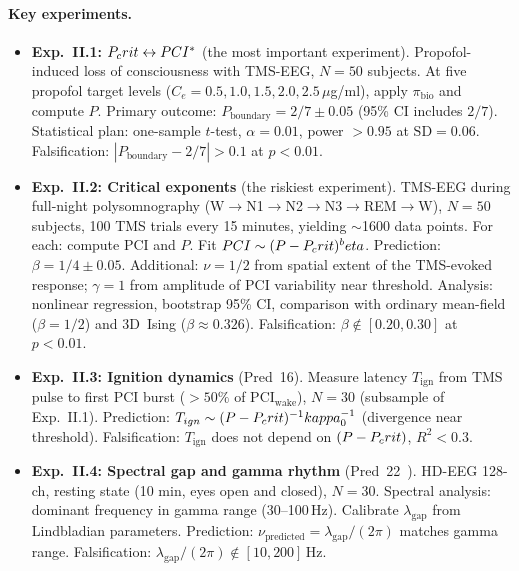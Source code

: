 \paragraph{Key experiments.}
\begin{itemize}[leftmargin=2em]
  \item \textbf{Exp.~II.1: $P_crit \leftrightarrow PCI^*$} (the most important
        experiment). Propofol-induced loss of consciousness with TMS-EEG, $N = 50$ subjects.
        At five propofol target levels ($C_e = 0.5, 1.0, 1.5, 2.0, 2.5$\,$\mu$g/ml), apply
        $\pi_{\mathrm{bio}}$ and compute $P$. Primary outcome:
        $P_{\mathrm{boundary}} = 2/7 \pm 0.05$ (95\% CI includes $2/7$). Statistical plan:
        one-sample $t$-test, $\alpha = 0.01$, power $> 0.95$ at $\mathrm{SD} = 0.06$.
        Falsification: $|P_{\mathrm{boundary}} - 2/7| > 0.1$ at $p < 0.01$.
  \item \textbf{Exp.~II.2: Critical exponents} (the riskiest experiment). TMS-EEG during
        full-night polysomnography (W$\to$N1$\to$N2$\to$N3$\to$REM$\to$W), $N = 50$
        subjects, 100 TMS trials every 15 minutes, yielding $\sim$1600 data points. For
        each: compute PCI and $P$. Fit $PCI \sim (P - P_crit)^beta$. Prediction:
        $\beta = 1/4 \pm 0.05$. Additional: $\nu = 1/2$ from spatial extent of the TMS-evoked
        response; $\gamma = 1$ from amplitude of PCI variability near threshold. Analysis:
        nonlinear regression, bootstrap 95\% CI, comparison with ordinary mean-field ($\beta = 1/2$)
        and 3D~Ising ($\beta \approx 0.326$). Falsification: $\beta \notin [0.20, 0.30]$
        at $p < 0.01$.
  \item \textbf{Exp.~II.3: Ignition dynamics} (Pred~16). Measure latency $T_{\mathrm{ign}}$
        from TMS pulse to first PCI burst ($> 50\%$ of $\mathrm{PCI}_{\mathrm{wake}}$),
        $N = 30$ (subsample of Exp.~II.1). Prediction:
        $T_{ign} \sim (P - P_crit)^{-1}kappa_0^{-1}$ (divergence near threshold).
        Falsification: $T_{\mathrm{ign}}$ does not depend on $(P - P_crit)$, $R^2 < 0.3$.
  \item \textbf{Exp.~II.4: Spectral gap and gamma rhythm} (Pred~22~). HD-EEG 128-ch,
        resting state (10 min, eyes open and closed), $N = 30$. Spectral analysis: dominant
        frequency in gamma range (30--100\,Hz). Calibrate $\lambda_{\mathrm{gap}}$ from
        Lindbladian parameters. Prediction:
        $\nu_{\mathrm{predicted}} = \lambda_{\mathrm{gap}}/(2\pi)$ matches gamma range.
        Falsification: $\lambda_{\mathrm{gap}}/(2\pi) \notin [10, 200]$\,Hz.
\end{itemize}

